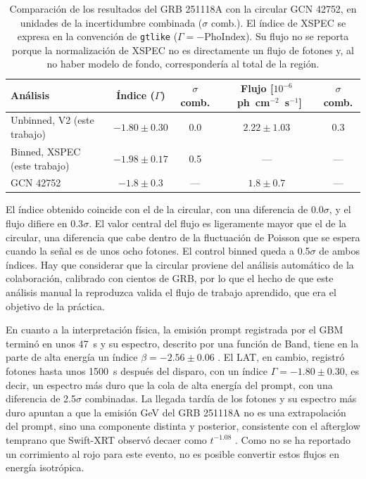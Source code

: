\begin{table}[h!]
\centering
\caption{Comparación de los resultados del GRB 251118A con la circular GCN 42752, en unidades de la
incertidumbre combinada ($\sigma$ comb.). El índice de XSPEC se expresa en la convención de
\texttt{gtlike} ($\Gamma = -\mathrm{PhoIndex}$). Su flujo no se reporta porque la normalización de XSPEC
no es directamente un flujo de fotones y, al no haber modelo de fondo, correspondería al total de la
región.}
\label{tab:comparacion251118A}
\small
\setlength{\tabcolsep}{4.5pt}
\begin{tabular}{lcccc}
\toprule
\textbf{Análisis} & \textbf{Índice} ($\Gamma$) & $\sigma$ \textbf{comb.} & \textbf{Flujo [$10^{-6}$~ph~cm$^{-2}$~s$^{-1}$]} & $\sigma$ \textbf{comb.} \\
\midrule
Unbinned, V2 (este trabajo) & $-1.80 \pm 0.30$ & 0.0 & $2.22 \pm 1.03$ & 0.3 \\
Binned, XSPEC (este trabajo) & $-1.98 \pm 0.17$ & 0.5 & --- & --- \\
GCN 42752 & $-1.8 \pm 0.3$ & --- & $1.8 \pm 0.7$ & --- \\
\bottomrule
\end{tabular}
\end{table}

El índice obtenido coincide con el de la circular, con una diferencia de 0.0$\sigma$, y el flujo difiere
en 0.3$\sigma$. El valor central del flujo es ligeramente mayor que el de la circular, una diferencia que
cabe dentro de la fluctuación de Poisson que se espera cuando la señal es de unos ocho fotones. El
control binned queda a 0.5$\sigma$ de ambos índices. Hay que considerar que la circular proviene del
análisis automático de la colaboración, calibrado con cientos de GRB, por lo que el hecho de que este
análisis manual la reproduzca valida el flujo de trabajo aprendido, que era el objetivo de la práctica.

En cuanto a la interpretación física, la emisión prompt registrada por el GBM terminó en unos 47~s y su
espectro, descrito por una función de Band, tiene en la parte de alta energía un índice
$\beta = -2.56 \pm 0.06$ \cite{GCN42783}. El LAT, en cambio, registró fotones hasta unos 1500~s después
del disparo, con un índice $\Gamma = -1.80 \pm 0.30$, es decir, un espectro más duro que la cola de alta
energía del prompt, con una diferencia de 2.5$\sigma$ combinadas. La llegada tardía de los fotones y su
espectro más duro apuntan a que la emisión GeV del GRB 251118A no es una extrapolación del prompt, sino
una componente distinta y posterior, consistente con el afterglow temprano que Swift-XRT observó decaer
como $t^{-1.08}$ \cite{GCN42782}. Como no se ha reportado un corrimiento al rojo para este evento, no es
posible convertir estos flujos en energía isotrópica.
